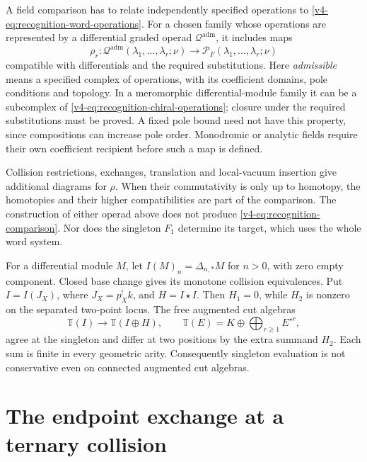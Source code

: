 A field comparison has to relate independently specified
operations to \eqref{v4-eq:recognition-word-operations}. For a
chosen family whose operations are represented by a differential
graded operad \(\mathcal Q^{\mathrm{adm}}\), it includes maps
\begin{equation}\label{v4-eq:recognition-comparison}
 \rho_r:\mathcal Q^{\mathrm{adm}}
                 (\lambda_1,\ldots,\lambda_r;\nu)
       \longrightarrow
                 \mathcal P_F(\lambda_1,\ldots,\lambda_r;\nu)
\end{equation}
compatible with differentials and the required substitutions.
Here \emph{admissible} means a specified complex of operations, with
its coefficient domains, pole conditions and topology. In a
meromorphic differential-module family it can be a subcomplex
of \eqref{v4-eq:recognition-chiral-operations}; closure under the
required substitutions must be proved. A fixed pole bound need
not have this property, since compositions can increase pole
order. Monodromic or analytic fields require their own coefficient
recipient before such a map is defined.

Collision restrictions, exchanges, translation and local-vacuum
insertion give additional diagrams for \(\rho\). When their
commutativity is only up to homotopy, the homotopies and their
higher compatibilities are part of the comparison. The
construction of either operad above does not produce
\eqref{v4-eq:recognition-comparison}. Nor does the singleton
\(F_1\) determine its target, which uses the whole word system.

\begin{example}
\label{v4-ex:recognition-singleton}
For a differential module \(M\), let
\(I(M)_n=\Delta_{n,*}M\) for \(n>0\), with zero empty
component. Closed base change gives its monotone collision
equivalences. Put \(I=I(J_X)\), where \(J_X=p_X^!k\), and
\(H=I\star I\). Then \(H_1=0\), while \(H_2\) is nonzero
on the separated two-point locus. The free augmented cut
algebras
\[
 \mathbb T(I)\longrightarrow\mathbb T(I\oplus H),
 \qquad \mathbb T(E)=K\oplus\bigoplus_{r\geq1}E^{\star r},
\]
agree at the singleton and differ at two positions by the extra
summand \(H_2\). Each sum is finite in every geometric arity.
Consequently singleton evaluation is not conservative even on
connected augmented cut algebras.
\end{example}

\section{The endpoint exchange at a ternary collision}
\label{v4-sec:recognition-spectator}

